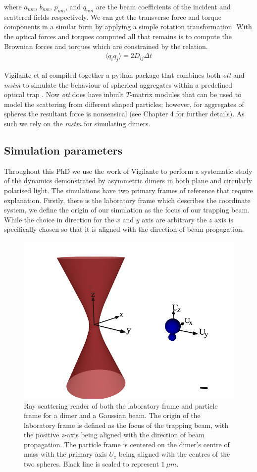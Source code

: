 where $a_{nm}$, $b_{nm}$, $p_{nm}$, and $q_{nm}$ are the beam coefficients
of the incident and scattered fields respectively. We can get the transverse 
force and torque components in a similar form by applying a simple rotation 
transformation. With the optical forces and torques computed all that remains
is to compute the Brownian forces and torques which are constrained by the relation.
\begin{align}
	\langle q_iq_j\rangle =2D_{ij}\Delta t
\end{align}

Vigilante et al compiled together a python package that combines both 
\textit{ott} and \textit{mstm} to simulate the behaviour of spherical 
aggregates within a predefined optical trap \cite{Vigilante2020}. Now 
\textit{ott} does have inbuilt $T$-matrix modules that can be used to 
model the scattering from different shaped particles; however, for 
aggregates of spheres the resultant force is nonsensical (see Chapter 
4 for further details). As such we rely on the \textit{mstm} for 
simulating dimers.  

\subsection{Simulation parameters}
\label{sec:sim_parameters}
Throughout this PhD we use the work of Vigilante to perform a systematic 
study of the dynamics demonstrated by asymmetric dimers in both plane and 
circularly polarised light. The simulations have two primary frames of 
reference that require explanation. Firstly, there is the laboratory frame 
which describes the coordinate system, we define the origin of our simulation
as the focus of our trapping beam. While the choice in direction for the $x$ 
and $y$ axis are arbitrary the $z$ axis is specifically chosen so that it is 
aligned with the direction of beam propagation. 
\begin{figure}[h!]
	\centering
	\includegraphics[width=0.6\linewidth]{lab_frame.png}
	\caption{Ray scattering render of both the laboratory frame and particle 
		frame for a dimer and a Gaussian beam. The origin of the laboratory 
		frame is defined as the focus of the trapping beam, with the positive 
		$z$-axis being aligned with the direction of beam propagation. The 
		particle frame is centered on the dimer's centre of mass with the 
		primary axis $U_z$ being aligned with the centres of the two spheres.
		Black line is scaled to represent $1\ \mu m$.}
	\label{fig:lab_frame} 
\end{figure} 

